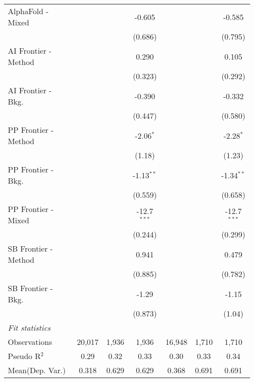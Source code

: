 \begin{tabular}{lcccccc}
   AlphaFold - Mixed    &                &               & -0.605        &                &               & -0.585\\   
                        &                &               & (0.686)       &                &               & (0.795)\\   
   AI Frontier - Method &                &               & 0.290         &                &               & 0.105\\   
                        &                &               & (0.323)       &                &               & (0.292)\\   
   AI Frontier - Bkg.   &                &               & -0.390        &                &               & -0.332\\   
                        &                &               & (0.447)       &                &               & (0.580)\\   
   PP Frontier - Method &                &               & -2.06$^{*}$   &                &               & -2.28$^{*}$\\   
                        &                &               & (1.18)        &                &               & (1.23)\\   
   PP Frontier - Bkg.   &                &               & -1.13$^{**}$  &                &               & -1.34$^{**}$\\   
                        &                &               & (0.559)       &                &               & (0.658)\\   
   PP Frontier - Mixed  &                &               & -12.7$^{***}$ &                &               & -12.7$^{***}$\\   
                        &                &               & (0.244)       &                &               & (0.299)\\   
   SB Frontier - Method &                &               & 0.941         &                &               & 0.479\\   
                        &                &               & (0.885)       &                &               & (0.782)\\   
   SB Frontier - Bkg.   &                &               & -1.29         &                &               & -1.15\\   
                        &                &               & (0.873)       &                &               & (1.04)\\   
   \midrule
   \emph{Fit statistics}\\
   Observations         & 20,017         & 1,936         & 1,936         & 16,948         & 1,710         & 1,710\\  
   Pseudo R$^2$         & 0.29           & 0.32          & 0.33          & 0.30           & 0.33          & 0.34\\  
Mean(Dep. Var.) & 0.318 & 0.629 & 0.629 & 0.368 & 0.691 & 0.691 \\
   

\end{tabular}
